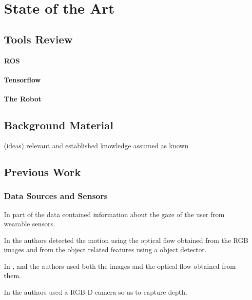 \chapter{State of the Art}
\label{chapter:state_of_the_art}

\section{Tools Review}

\subsubsection{ROS}

\subsubsection{Tensorflow}

\subsubsection{The Robot}

\section{Background Material}

{\color{gray}
(ideas) relevant and established knowledge assumed as known
}

\section{Previous Work}

\subsection{Data Sources and Sensors}

In \cite{Schydlo2018} part of the data contained information about the gaze of the user from wearable sensors.

In \cite{Furnari2021} the authors detected the motion using the optical flow obtained from the RGB images and from the object related features using a object detector.

In \cite{Gammulle2019}, \cite{Wu2021} and \cite{Rodriguez2019} the authors used both the images and the optical flow obtained from them.

In \cite{Moutinho2023} the authors used a RGB-D camera so as to capture depth.

